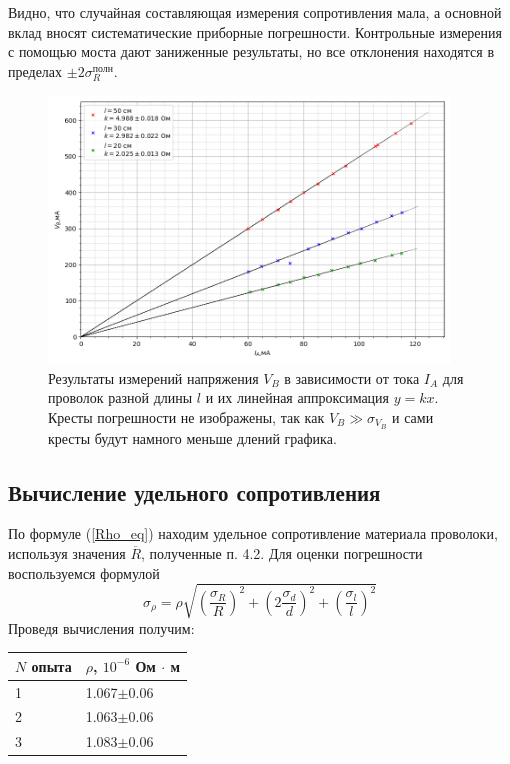\documentclass[12pt,a4paper]{article}
\begin{document}
Видно, что случайная составляющая измерения сопротивления мала, а основной вклад вносят систематические приборные погрешности. Контрольные измерения с помощью моста дают
заниженные результаты, но все отклонения находятся в пределах $\pm2 \sigma ^{полн} _{R}$.
\begin{figure}[htbp]
\includegraphics[width=0.95\textwidth]{imgs/graphic.png}
\caption{Результаты измерений напряжения $V_B$ в зависимости от тока $I_A$ для проволок разной длины $l$ и
их линейная аппроксимация $y=kx$. Кресты погрешности не изображены, так как $V_B\gg\sigma_{V_B}$ и сами кресты будут намного меньше длений графика.}
\label{fig:graphic}
\end{figure}

\subsection{ Вычисление удельного сопротивления}
По формуле (\ref{Rho_eq}) находим удельное сопротивление материала проволоки, используя значения
$\overline{R}$, полученные п. 4.2. Для оценки погрешности воспользуемся формулой
\begin{equation}
    \sigma _{\rho} = \rho\sqrt{ \left( \frac{\sigma _R}{R} \right)^2 + \left( 2\frac{\sigma _d}{d} \right)^2 +\left( \frac{\sigma _l}{l} \right)^2 }
\end{equation}
Проведя вычисления получим:
\begin{table}[!ht]
    \quad\quad\begin{tabular}{|l|l|}
    \hline
    $N$ опыта & $\rho$, $10^{-6}$ Ом $\cdot$ м \\ \hline
    1 & 1.067$\pm$0.06\\ \hline
    2 & 1.063$\pm$0.06\\ \hline
    3 & 1.083$\pm$0.06\\ 
    \hline
    \end{tabular}
\end{table}
\end{document}
